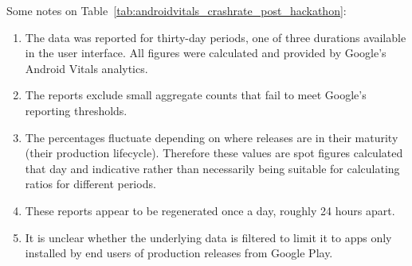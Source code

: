 Some notes on Table~\ref{tab:androidvitals_crashrate_post_hackathon}:
\begin{enumerate}
    \item The data was reported for thirty-day periods, one of three durations available in the user interface. All figures were calculated and provided by Google's Android Vitals analytics.
    \item The reports exclude small aggregate counts that fail to meet Google's reporting thresholds.
    \item The percentages fluctuate depending on where releases are in their maturity (their production lifecycle). Therefore these values are spot figures calculated that day and indicative rather than necessarily being suitable for calculating ratios for different periods. 
    \item These reports appear to be regenerated once a day, roughly 24 hours apart.
    \item It is unclear whether the underlying data is filtered to limit it to apps only installed by end users of production releases from Google Play.
\end{enumerate}


